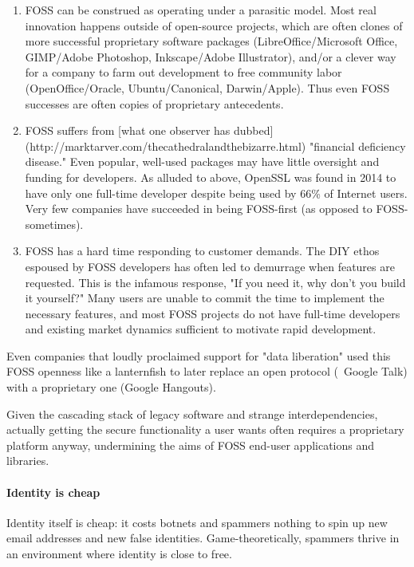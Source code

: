 \begin{enumerate}
	\item  FOSS can be construed as operating under a parasitic model.  Most real innovation happens outside of open-source projects, which are often clones of more successful proprietary software packages (LibreOffice/Microsoft Office, GIMP/Adobe Photoshop, Inkscape/Adobe Illustrator), and/or a clever way for a company to farm out development to free community labor (OpenOffice/Oracle, Ubuntu/Canonical, Darwin/Apple).  Thus even FOSS successes are often copies of proprietary antecedents.
  \item  FOSS suffers from [what one observer has dubbed](http://marktarver.com/thecathedralandthebizarre.html) "financial deficiency disease."  Even popular, well-used packages may have little oversight and funding for developers.  As alluded to above, OpenSSL was found in 2014 to have only one full-time developer despite being used by 66\% of Internet users.  Very few companies have succeeded in being FOSS-first (as opposed to FOSS-sometimes).
  \item  FOSS has a hard time responding to customer demands.  The DIY ethos espoused by FOSS developers has often led to demurrage when features are requested.  This is the infamous response, "If you need it, why don't you build it yourself?"  Many users are unable to commit the time to implement the necessary features, and most FOSS projects do not have full-time developers and existing market dynamics sufficient to motivate rapid development.
\end{enumerate}

Even companies that loudly proclaimed support for "data liberation" used this FOSS openness like a lanternfish to later replace an open protocol (\eg~Google Talk) with a proprietary one (Google Hangouts).

Given the cascading stack of legacy software and strange interdependencies, actually getting the secure functionality a user wants often requires a proprietary platform anyway, undermining the aims of FOSS end-user applications and libraries.

\paragraph{Identity is cheap}

Identity itself is cheap:  it costs botnets and spammers nothing to spin up new email addresses and new false identities.  Game-theoretically, spammers thrive in an environment where identity is close to free.

